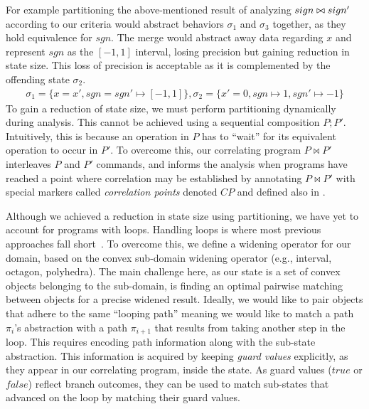 For example partitioning the above-mentioned result of analyzing $sign \bowtie sign'$ according to our criteria would abstract behaviors $\sigma_1$ and $\sigma_3$ together, as they hold equivalence for $sgn$. The merge would abstract away data regarding $x$ and represent $sgn$ as the $[-1,1]$ interval, losing precision but gaining reduction in state size. This loss of precision is acceptable as it is complemented by the offending state $\sigma_2$.
{\footnotesize
\[
\begin{array}{c}
\sigma_1 = \{x = x', sgn = sgn' \mapsto [-1,1]\} ,
\sigma_2 = \{x' = 0, sgn \mapsto 1, sgn' \mapsto -1\}
\end{array}
\]
}
To gain a reduction of state size, we must perform partitioning dynamically during analysis. This cannot be achieved using a sequential composition $P;P'$. Intuitively, this is because an operation in $P$ has to ``wait'' for its equivalent operation to occur in $P'$. To overcome this, our correlating program $P \bowtie P'$ interleaves $P$ and $P'$ commands, and informs the analysis when programs have reached a point where correlation may be established by annotating $P \bowtie P'$ with special markers called \emph{correlation points} denoted $CP$ and defined also in .


 Although we achieved a reduction in state size using partitioning, we have yet to account for programs with loops. Handling loops is where most previous approaches fall short~\cite{GodlinStrichman09,KawaguchiLahiriRebelo10,DwyerElbaumPerson08,EnglerRamos11}. To overcome this, we define a widening operator for our domain, based on the convex sub-domain widening operator (e.g., interval, octagon, polyhedra). The main challenge here, as our state is a set of convex objects belonging to the sub-domain, is finding an optimal pairwise matching between objects for a precise widened result. Ideally, we would like to pair objects that adhere to the same ``looping path'' meaning we would like to match a path $\pi_i$'s abstraction with a path $\pi_{i+1}$ that results from taking another step in the loop. This requires encoding path information along with the sub-state abstraction. This information is acquired by keeping \emph{guard values} explicitly, as they appear in our correlating program, inside the state. As guard values ($true$ or $false$) reflect branch outcomes, they can be used to match sub-states that advanced on the loop by matching their guard values.


